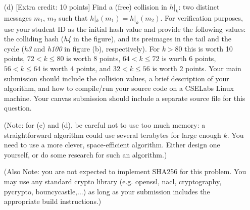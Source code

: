 \documentclass[11pt]{article}
\begin{document}
\begin{itemize}
\item[(d)] [Extra credit: 10 points] Find a (free) collision in
  $h|_k$: two distinct messages $m_1$, $m_2$ such that
  $h|_k(m_1)=h|_k(m_2)$.  For verification purposes, use your student ID as
  the initial hash value and provide the following values: the colliding
  hash (\emph{h4} in the figure), and its preimages in the tail and
  the cycle (\emph{h3} and \emph{h100} in figure (b), respectively).
  For $k>80$ this is worth 10 points, $72 < k \leq 80$ is worth 8 points, $64
  < k \leq 72$ is worth 6 points, $56 < k \leq 64$ is worth 4 points,
  and $32 < k \leq 56$ is worth 2 points.  Your main submission should
  include the collision values, a brief description of your algorithm, and how to compile/run
  your source code on a CSELabs Linux machine.  Your canvas submission
  should include a separate source file for this question.

  (Note: for (c) and (d), be careful not to use too much memory: a
  straightforward algorithm could use several terabytes for large
  enough $k$.  You need to use a more clever, space-efficient algorithm.
  Either design one yourself, or do some research for such an
  algorithm.)

  (Also Note: you are not expected to implement SHA256 for this
  problem.  You may use any standard crypto library (e.g. openssl,
  nacl, cryptography, pycrypto, bouncycastle,...) as long as your
  submission includes the appropriate build instructions.)

\end{itemize}
\end{document}
